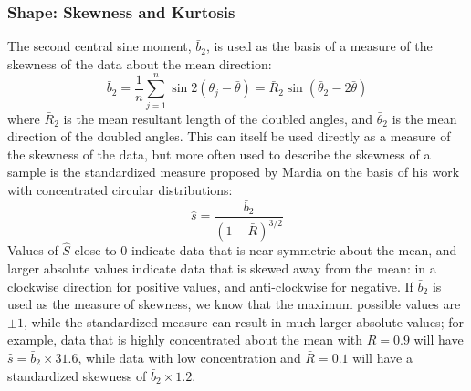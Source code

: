 \documentclass[../../ArchStats.tex]{subfiles}
\begin{document}
 



\subsubsection{Shape: Skewness and Kurtosis}
\label{sec:shape}

The second central sine moment, $\bar{b}_2$, is used as the basis of a measure of the skewness of the data about the mean direction:
\[ \bar{b}_2 = \frac{1}{n} \sum_{j=1}^n \sin 2(\theta_j-\bar{\theta}) = \bar{R}_2 \sin(\bar{\theta}_2 - 2\bar{\theta}) \]
where $\bar{R}_2$ is the mean resultant length of the doubled angles, and $\bar{\theta}_2$ is the mean direction of the doubled angles. This can itself be used directly as a measure of the skewness of the data, but more often used to describe the skewness of a sample is the standardized measure proposed by Mardia \cite{Mardia1972} on the basis of his work with concentrated circular distributions:
\[\hat{s} = \frac{\bar{b}_2}{(1-\bar{R})^{3/2}}\]
Values of $\hat{S}$ close to 0 indicate data that is near-symmetric about the mean, and larger  absolute values indicate data that is skewed away from the mean: in a clockwise direction for positive values, and anti-clockwise for negative. If $\bar{b}_2$ is used as the measure of skewness, we know that the maximum possible values are $\pm 1$, while the standardized measure can result in much larger absolute values; for example, data that is highly concentrated about the mean with $\bar{R} = 0.9$ will have $\hat{s} = \bar{b}_2 \times 31.6$, while data with low concentration and $\bar{R} = 0.1$ will have a standardized skewness of $\bar{b}_2 \times 1.2$.
\end{document}
